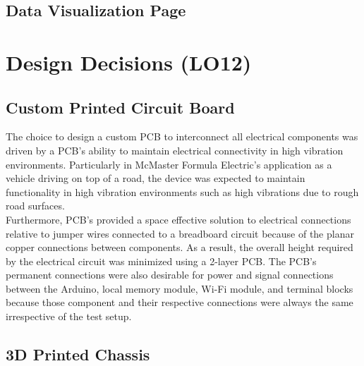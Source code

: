 \documentclass{article}
\begin{document}
\subsection{Data Visualization Page}

\section{Design Decisions (LO12)}


\subsection{Custom Printed Circuit Board}
The choice to design a custom PCB to interconnect all electrical components was driven by a PCB's ability to maintain  electrical connectivity in high vibration environments. Particularly in McMaster Formula Electric's application as a vehicle driving on top of a road, the device was expected to maintain functionality in high vibration environments such as high vibrations due to rough road surfaces. \\

Furthermore, PCB's provided a space effective solution to electrical connections relative to jumper wires connected to a breadboard circuit because of the planar copper connections between components. As a result, the overall height required by the electrical circuit was minimized using a 2-layer PCB. The PCB's permanent connections were also desirable for power and signal connections between the Arduino, local memory module, Wi-Fi module, and terminal blocks because those component and their respective connections were always the same irrespective of the test setup. \\

\subsection{3D Printed Chassis}
\end{document}
